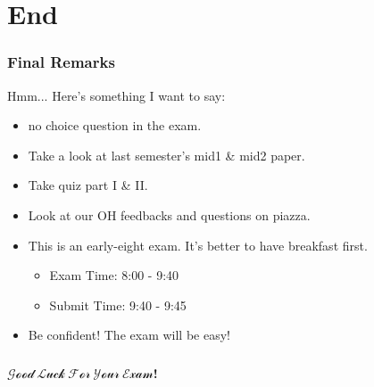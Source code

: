 \documentclass{beamer}
\begin{document}
\section{End}
\begin{frame}
    \frametitle{Final Remarks}
    Hmm... Here's something I want to say:
    \\ \vv 
    \begin{itemize}
        \item no choice question in the exam.
        \item Take a look at last semester's mid1 \& mid2 paper.
        \item Take quiz part I \& II.
        \item Look at our OH feedbacks and questions on piazza.
        \item {} This is an early-eight exam. 
        It's better to have breakfast first. 
            \begin{itemize}
                \item Exam Time: 8:00 - 9:40
                \item Submit Time: 9:40 - 9:45
            \end{itemize}
        \item Be confident! The exam will be easy!
    \end{itemize}
\end{frame}
\usebackgroundtemplate{}
\begin{frame}
    \frametitle{}
    \usebackgroundtemplate{}
    \centering
    
    \textcolor[rgb]{0.3,0.3,0.3}{\textbf{\huge{$\mathcal{Good~Luck~For~Your~Exam}$!}}}
\end{frame}
\end{document}
